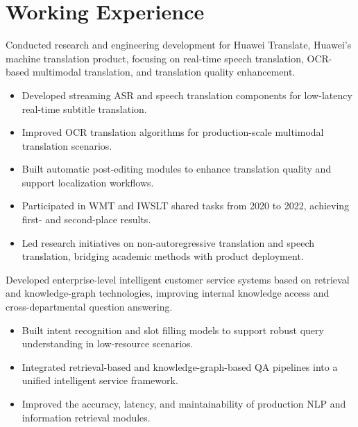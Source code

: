 \documentclass{resume_en_tm}
\begin{document}



\section{Working Experience}
Conducted research and engineering development for Huawei Translate, Huawei's machine translation product, focusing on real-time speech translation, OCR-based multimodal translation, and translation quality enhancement.
\begin{itemize}
  \item Developed streaming ASR and speech translation components for low-latency real-time subtitle translation.
  \item Improved OCR translation algorithms for production-scale multimodal translation scenarios.
  \item Built automatic post-editing modules to enhance translation quality and support localization workflows.
  \item Participated in WMT and IWSLT shared tasks from 2020 to 2022, achieving first- and second-place results.
  \item Led research initiatives on non-autoregressive translation and speech translation, bridging academic methods with product deployment.
\end{itemize}

Developed enterprise-level intelligent customer service systems based on retrieval and knowledge-graph technologies, improving internal knowledge access and cross-departmental question answering.
\begin{itemize}
  \item Built intent recognition and slot filling models to support robust query understanding in low-resource scenarios.
  \item Integrated retrieval-based and knowledge-graph-based QA pipelines into a unified intelligent service framework.
  \item Improved the accuracy, latency, and maintainability of production NLP and information retrieval modules.
\end{itemize}
\end{document}
